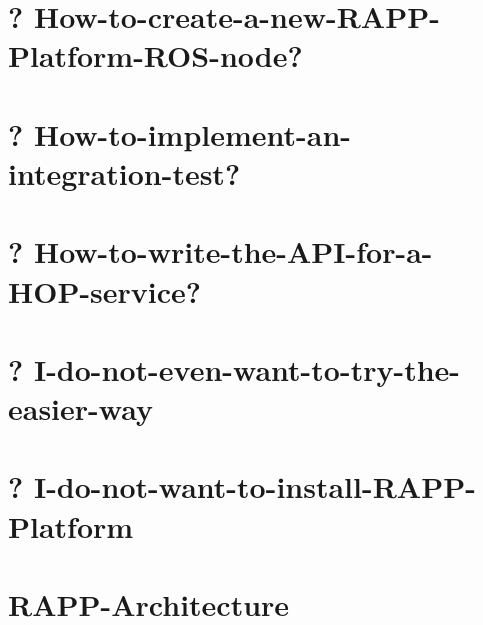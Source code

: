 \documentclass[twoside]{book}
\begin{document}
\chapter{? How-\/to-\/create-\/a-\/new-\/\-R\-A\-P\-P-\/\-Platform-\/\-R\-O\-S-\/node?}
\label{md_rapp-platform_8wiki_How-to-create-a-new-RAPP-Platform-ROS-node}
\hypertarget{md_rapp-platform_8wiki_How-to-create-a-new-RAPP-Platform-ROS-node}{}

\chapter{? How-\/to-\/implement-\/an-\/integration-\/test?}
\label{md_rapp-platform_8wiki_How-to-implement-an-integration-test}
\hypertarget{md_rapp-platform_8wiki_How-to-implement-an-integration-test}{}

\chapter{? How-\/to-\/write-\/the-\/\-A\-P\-I-\/for-\/a-\/\-H\-O\-P-\/service?}
\label{md_rapp-platform_8wiki_How-to-write-the-API-for-a-HOP-service}
\hypertarget{md_rapp-platform_8wiki_How-to-write-the-API-for-a-HOP-service}{}

\chapter{? I-\/do-\/not-\/even-\/want-\/to-\/try-\/the-\/easier-\/way}
\label{md_rapp-platform_8wiki_I-do-not-even-want-to-try-the-easier-way_8-Do-you-have-something-up-and-running-to-test}
\hypertarget{md_rapp-platform_8wiki_I-do-not-even-want-to-try-the-easier-way_8-Do-you-have-something-up-and-running-to-test}{}

\chapter{? I-\/do-\/not-\/want-\/to-\/install-\/\-R\-A\-P\-P-\/\-Platform}
\label{md_rapp-platform_8wiki_I-do-not-want-to-install-RAPP-Platform_8-Is-there-an-easier-way-to-use-it}
\hypertarget{md_rapp-platform_8wiki_I-do-not-want-to-install-RAPP-Platform_8-Is-there-an-easier-way-to-use-it}{}

\chapter{R\-A\-P\-P-\/\-Architecture}
\label{md_rapp-platform_8wiki_RAPP-Architecture}
\hypertarget{md_rapp-platform_8wiki_RAPP-Architecture}{}

\end{document}
